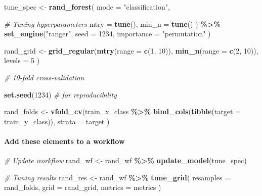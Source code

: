 \documentclass[
]{book}
\newenvironment{Shaded}{\begin{snugshade}}{\end{snugshade}}
\newcommand{\AttributeTok}[1]{\textcolor[rgb]{0.13,0.29,0.53}{#1}}
\newcommand{\CommentTok}[1]{\textcolor[rgb]{0.56,0.35,0.01}{\textit{#1}}}
\newcommand{\DecValTok}[1]{\textcolor[rgb]{0.00,0.00,0.81}{#1}}
\newcommand{\FunctionTok}[1]{\textcolor[rgb]{0.13,0.29,0.53}{\textbf{#1}}}
\newcommand{\NormalTok}[1]{#1}
\newcommand{\OtherTok}[1]{\textcolor[rgb]{0.56,0.35,0.01}{#1}}
\newcommand{\SpecialCharTok}[1]{\textcolor[rgb]{0.81,0.36,0.00}{\textbf{#1}}}
\newcommand{\StringTok}[1]{\textcolor[rgb]{0.31,0.60,0.02}{#1}}
\begin{document}
\begin{Shaded}
\begin{Highlighting}[]
\NormalTok{tune\_spec }\OtherTok{\textless{}{-}}
  \FunctionTok{rand\_forest}\NormalTok{(}
    \AttributeTok{mode =} \StringTok{"classification"}\NormalTok{,}

    \CommentTok{\# Tuning hyperparameters}
    \AttributeTok{mtry =} \FunctionTok{tune}\NormalTok{(),}
    \AttributeTok{min\_n =} \FunctionTok{tune}\NormalTok{()}
\NormalTok{  ) }\SpecialCharTok{\%\textgreater{}\%}
  \FunctionTok{set\_engine}\NormalTok{(}\StringTok{"ranger"}\NormalTok{,}
    \AttributeTok{seed =} \DecValTok{1234}\NormalTok{,}
    \AttributeTok{importance =} \StringTok{"permutation"}
\NormalTok{  )}

\NormalTok{rand\_grid }\OtherTok{\textless{}{-}} \FunctionTok{grid\_regular}\NormalTok{(}\FunctionTok{mtry}\NormalTok{(}\AttributeTok{range =} \FunctionTok{c}\NormalTok{(}\DecValTok{1}\NormalTok{, }\DecValTok{10}\NormalTok{)),}
  \FunctionTok{min\_n}\NormalTok{(}\AttributeTok{range =} \FunctionTok{c}\NormalTok{(}\DecValTok{2}\NormalTok{, }\DecValTok{10}\NormalTok{)),}
  \AttributeTok{levels =} \DecValTok{5}
\NormalTok{)}
\end{Highlighting}
\end{Shaded}

\begin{Shaded}
\begin{Highlighting}[]
\CommentTok{\# 10{-}fold cross{-}validation}

\FunctionTok{set.seed}\NormalTok{(}\DecValTok{1234}\NormalTok{) }\CommentTok{\# for reproducibility}

\NormalTok{rand\_folds }\OtherTok{\textless{}{-}} \FunctionTok{vfold\_cv}\NormalTok{(train\_x\_class }\SpecialCharTok{\%\textgreater{}\%} \FunctionTok{bind\_cols}\NormalTok{(}\FunctionTok{tibble}\NormalTok{(}\AttributeTok{target =}\NormalTok{ train\_y\_class)),}
  \AttributeTok{strata =}\NormalTok{ target}
\NormalTok{)}
\end{Highlighting}
\end{Shaded}

\paragraph{Add these elements to a workflow}\label{add-these-elements-to-a-workflow-2}

\begin{Shaded}
\begin{Highlighting}[]
\CommentTok{\# Update workflow}
\NormalTok{rand\_wf }\OtherTok{\textless{}{-}}\NormalTok{ rand\_wf }\SpecialCharTok{\%\textgreater{}\%} \FunctionTok{update\_model}\NormalTok{(tune\_spec)}

\CommentTok{\# Tuning results}
\NormalTok{rand\_res }\OtherTok{\textless{}{-}}\NormalTok{ rand\_wf }\SpecialCharTok{\%\textgreater{}\%}
  \FunctionTok{tune\_grid}\NormalTok{(}
    \AttributeTok{resamples =}\NormalTok{ rand\_folds,}
    \AttributeTok{grid =}\NormalTok{ rand\_grid,}
    \AttributeTok{metrics =}\NormalTok{ metrics}
\NormalTok{  )}
\end{Highlighting}
\end{Shaded}
\end{document}
